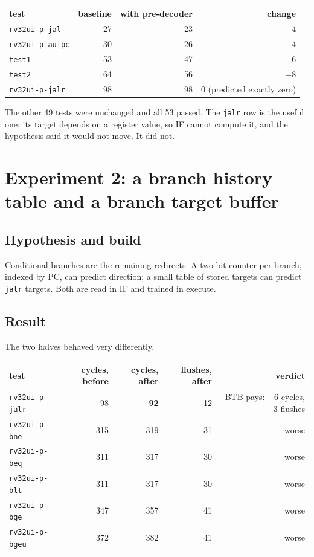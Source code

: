 \documentclass[11pt]{article}
\begin{document}
\begin{center}
\begin{tabular}{lrrr}
\toprule
test & baseline & with pre-decoder & change \\
\midrule
\texttt{rv32ui-p-jal}   & 27 & 23 & $-4$ \\
\texttt{rv32ui-p-auipc} & 30 & 26 & $-4$ \\
\texttt{test1}          & 53 & 47 & $-6$ \\
\texttt{test2}          & 64 & 56 & $-8$ \\
\texttt{rv32ui-p-jalr}  & 98 & 98 & $0$ (predicted exactly zero) \\
\bottomrule
\end{tabular}
\end{center}

The other 49 tests were unchanged and all 53 passed. The \texttt{jalr} row is the useful one:
its target depends on a register value, so IF cannot compute it, and the hypothesis said it
would not move. It did not.

\section{Experiment 2: a branch history table and a branch target buffer}

\subsection{Hypothesis and build}

Conditional branches are the remaining redirects. A two-bit counter per branch, indexed by PC,
can predict direction; a small table of stored targets can predict \texttt{jalr} targets. Both
are read in IF and trained in execute.

\subsection{Result}

The two halves behaved very differently.

\begin{center}
\begin{tabular}{lrrrr}
\toprule
test & cycles, before & cycles, after & flushes, after & verdict \\
\midrule
\texttt{rv32ui-p-jalr} & 98 & \textbf{92} & 12 & BTB pays: $-6$ cycles, $-3$ flushes \\
\texttt{rv32ui-p-bne}  & 315 & 319 & 31 & worse \\
\texttt{rv32ui-p-beq}  & 311 & 317 & 30 & worse \\
\texttt{rv32ui-p-blt}  & 311 & 317 & 30 & worse \\
\texttt{rv32ui-p-bge}  & 347 & 357 & 41 & worse \\
\texttt{rv32ui-p-bgeu} & 372 & 382 & 41 & worse \\
\bottomrule
\end{tabular}
\end{center}
\end{document}
